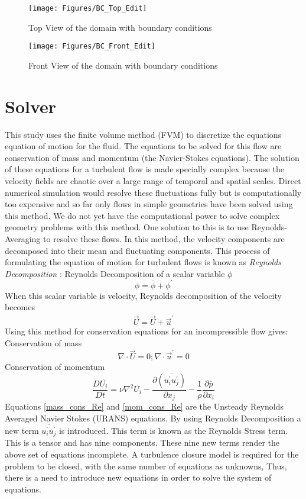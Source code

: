 \begin{figure}
\centering
\texttt{[image: Figures/BC\_Top\_Edit]}
\caption{Top View of the domain with boundary conditions}\label{fig:BC_Top}
\bigbreak
\texttt{[image: Figures/BC\_Front\_Edit]}
\caption{Front View of the domain with boundary conditions}\label{fig:BC_Front}
\end{figure}

\section{Solver}\label{Solver}
This study uses the finite volume method (FVM) to discretize the equations equation of motion for the fluid. The equations to be solved for this flow are conservation of mass and momentum (the Navier-Stokes equations). The solution of these equations for a turbulent flow is made specially complex because the velocity fields are chaotic over a large range of temporal and spatial scales. Direct numerical simulation would resolve these fluctuations fully but is computationally too expensive and so far only flows in simple geometries have been solved using this method. We do not yet have the computational power to solve complex geometry problems with this method. One solution to this is to use Reynolds-Averaging to resolve these flows. In this method, the velocity components are decomposed into their mean and fluctuating components. This process of formulating the equation of motion for turbulent flows is known as \textit{Reynolds Decomposition} \cite{Reference9}:
Reynolds Decomposition of a scalar variable $\phi$
\begin{equation}
\phi = \overline{\phi} + \phi^\prime
\end{equation}
When this scalar variable is velocity, Reynolds decomposition of the velocity becomes
\begin{equation}
\vec{U} = \overline{\vec{U}} + \vec{u}^\prime
\end{equation}
Using this method for conservation equations for an incompressible flow gives:
Conservation of mass
\begin{equation}
\nabla \cdot \vec{U} = 0; \nabla \cdot \vec{u}^\prime = 0 \label{mass_cons_Re}
\end{equation}
Conservation of momentum
\begin{equation}
\frac{D \overline{U_i}}{Dt} = \nu \nabla^2 \bar{U_i} - \frac{\partial(\overline{u_i^\prime u_j^\prime})}{\partial x_j} - \frac{1}{\rho} \frac{\partial \overline{p}}{\partial x_i} \label{mom_cons_Re}
\end{equation}
Equations \ref{mass_cons_Re} and \ref{mom_cons_Re} are the Unsteady Reynolds Averaged Navier Stokes (URANS) equations. By using Reynolds Decomposition a new term $\overline{u_i^\prime u_j^\prime}$ is introduced. This term is known as the Reynolds Stress term. This is a tensor and has nine components. These nine new terms render the above set of equations incomplete. A turbulence closure model is required for the problem to be closed, with the same number of equations as unknowns, Thus, there is a need to introduce new equations in order to solve the system of equations. 
